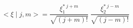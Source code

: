 \begin{equation}
<\xi \mid  j,m>=\frac{\xi_1^{*~j+m}}{\sqrt{(j+m)!}}~\frac{\xi_2^{*~j-m}}{\sqrt{(j-m)!}}
\end{equation}

